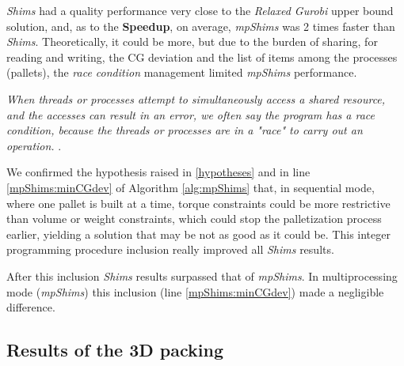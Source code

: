 \documentclass[preprint,authoryear]{elsarticle}
\begin{document}
{\it Shims} had a quality performance very close to the {\it Relaxed Gurobi} upper bound solution, and, as to the {\bf Speedup}, on average, {\it mpShims} was 2 times faster than {\it Shims}. Theoretically, it could be more, but due to the burden of sharing, for reading and writing, the CG deviation and the list of items among the processes (pallets), the {\it race condition} management limited {\it mpShims} performance.

{\it When threads or processes attempt to simultaneously access a shared resource, and the accesses can result in an error, we often say the program has a race condition, because the threads or processes are in a "race" to carry out an operation.} \cite[p. 53]{Pacheco:2020}.

We confirmed the hypothesis raised in \ref{hypotheses} and in line \ref{mpShims:minCGdev} of Algorithm \ref{alg:mpShims} that, in sequential mode, where one pallet is built at a time, torque constraints could be more restrictive than volume or weight constraints, which could stop the palletization process earlier, yielding a solution that may be not as good as it could be. This integer programming procedure inclusion really improved all {\it Shims} results.

After this inclusion {\it Shims} results surpassed that of {\it mpShims}. In multiprocessing mode ({\it mpShims}) this inclusion (line \ref{mpShims:minCGdev}) made a negligible difference.


\subsection{Results of the 3D packing}


\end{document}

